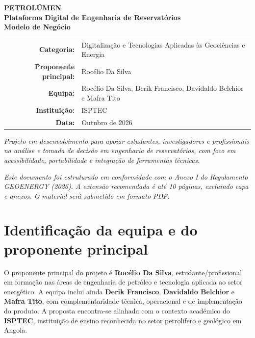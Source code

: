 \documentclass[11pt,a4paper]{article}
\begin{document}
\begin{titlepage}
    \centering
    \vspace*{1.5cm}
    {\Huge\textbf{\color{petrolblue} PETROLÚMEN}}\\[0.35cm]
    {\large\textbf{Plataforma Digital de Engenharia de Reservatórios}}\\[1.4cm]

    {\Large\textbf{Modelo de Negócio}}\\[1.2cm]

    \begin{tabular}{rl}
        \textbf{Categoria:} & Digitalização e Tecnologias Aplicadas às Geociências e Energia \\
        \textbf{Proponente principal:} & Rocélio Da Silva \\
        \textbf{Equipa:} & Rocélio Da Silva, Derik Francisco, Davidaldo Belchior e Mafra Tito \\
        \textbf{Instituição:} & ISPTEC \\
        \textbf{Data:} & Outubro de 2026 \\
    \end{tabular}

    \vfill
    \begin{minipage}{0.82\textwidth}
        \centering
        \small\textit{Projeto em desenvolvimento para apoiar estudantes, investigadores e profissionais na análise e tomada de decisão em engenharia de reservatórios, com foco em acessibilidade, portabilidade e integração de ferramentas técnicas.}
    \end{minipage}
\end{titlepage}

\noindent\textit{Este documento foi estruturado em conformidade com o Anexo I do Regulamento GEOENERGY (2026). A extensão recomendada é até 10 páginas, excluindo capa e anexos. O material será submetido em formato PDF.}

\tableofcontents
\newpage

\section{Identificação da equipa e do proponente principal}
O proponente principal do projeto é \textbf{Rocélio Da Silva}, estudante/profissional em formação nas áreas de engenharia de petróleo e tecnologia aplicada ao setor energético. A equipa inclui ainda \textbf{Derik Francisco}, \textbf{Davidaldo Belchior} e \textbf{Mafra Tito}, com complementaridade técnica, operacional e de implementação do produto. A proposta encontra-se alinhada com o contexto académico do \textbf{ISPTEC}, instituição de ensino reconhecida no setor petrolífero e geológico em Angola.
\end{document}
